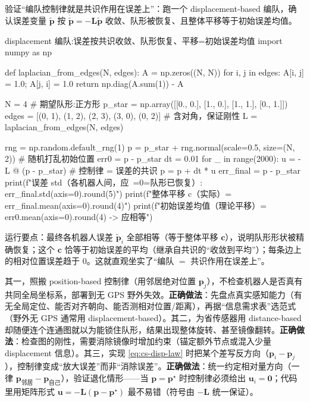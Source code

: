 验证“编队控制律就是共识作用在误差上”：跑一个 displacement-based 编队，确认误差变量 $\tilde{\mathbf{p}}$ 按 $\dot{\tilde{\mathbf{p}}}=-\mathbf{L}\tilde{\mathbf{p}}$ 收敛、队形被恢复、且整体平移等于初始误差均值。

\begin{codebox}[Python]{displacement 编队:误差按共识收敛、队形恢复、平移=初始误差均值}
import numpy as np

def laplacian_from_edges(N, edges):
    A = np.zeros((N, N))
    for i, j in edges:
        A[i, j] = 1.0; A[j, i] = 1.0
    return np.diag(A.sum(1)) - A

N = 4                                                # 期望队形:正方形
p_star = np.array([[0., 0.], [1., 0.], [1., 1.], [0., 1.]])
edges = [(0, 1), (1, 2), (2, 3), (3, 0), (0, 2)]     # 含对角，保证刚性
L = laplacian_from_edges(N, edges)

rng = np.random.default_rng(1)
p = p_star + rng.normal(scale=0.5, size=(N, 2))      # 随机打乱初始位置
err0 = p - p_star
dt = 0.01
for _ in range(2000):
    u = -L @ (p - p_star)                            # 控制律 = 误差的共识
    p = p + dt * u
err_final = p - p_star
print(f"误差 std（各机器人间，应~=0=队形已恢复）: {err_final.std(axis=0).round(5)}")
print(f"整体平移 c（实际）= {err_final.mean(axis=0).round(4)}")
print(f"初始误差均值（理论平移）= {err0.mean(axis=0).round(4)}  -> 应相等")
\end{codebox}

\noindent 运行要点：最终各机器人误差 $\tilde{\mathbf{p}}_i$ 全部相等（等于整体平移 $\mathbf{c}$），说明队形形状被精确恢复；这个 $\mathbf{c}$ 恰等于初始误差的平均（继承自共识的“收敛到平均”）；每条边上的相对位置误差趋于 0。这就直观坐实了“编队 $=$ 共识作用在误差上”。

\begin{pitfall}
其一，照搬 position-based 控制律（用邻居绝对位置 $\mathbf{p}_j$），不检查机器人是否真有共同全局坐标系，部署到无 GPS 野外失效。\textbf{正确做法}：先盘点真实感知能力（有无全局定位、能否对齐朝向、能否测相对位置/距离），再据“信息需求表”选范式（野外无 GPS 通常用 displacement-based）。其二，为省传感器用 distance-based 却随便连个连通图就以为能锁住队形，结果出现整体旋转、甚至镜像翻转。\textbf{正确做法}：检查图的刚性，需要消除镜像时增加约束（锚定额外节点或混入少量 displacement 信息）。其三，实现 \cref{eq:cs-disp-law} 时把某个差写反方向（$\mathbf{p}_i-\mathbf{p}_j$），控制律变成“放大误差”而非“消除误差”。\textbf{正确做法}：统一约定相对量方向（一律 $\mathbf{p}_{\text{邻居}}-\mathbf{p}_{\text{自己}}$），验证退化情形——当 $\mathbf{p}=\mathbf{p}^\star$ 时控制律必须给出 $\mathbf{u}_i=\mathbf{0}$；代码里用矩阵形式 $\mathbf{u}=-\mathbf{L}(\mathbf{p}-\mathbf{p}^\star)$ 最不易错（符号由 $-\mathbf{L}$ 统一保证）。
\end{pitfall}

